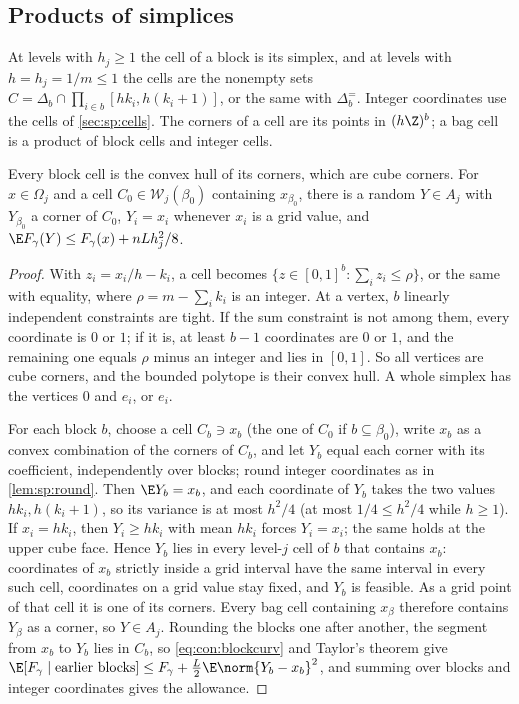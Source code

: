 \subsection{Products of simplices}\label{app:con:simplex}

At levels with $h_j\ge1$ the cell of a block is its simplex, and at levels
with $h=h_j=1/m\le1$ the cells are the nonempty sets
$C=\Delta_b\cap\prod_{i\in b}[hk_i,h(k_i+1)]$, or the same with
$\Delta^=_b$. Integer coordinates use the cells of \cref{sec:sp:cells}. The
corners of a cell are its points in $(h\Z)^b$; a bag cell is a product of
block cells and integer cells.

\begin{lemma}\label{lem:con:simplex-round}
Every block cell is the convex hull of its corners, which are cube corners.
For $x\in\Omega_j$ and a cell $C_0\in\mathcal W_j(\beta_0)$ containing
$x_{\beta_0}$, there is a random $Y\in A_j$ with $Y_{\beta_0}$ a corner of
$C_0$, $Y_i=x_i$ whenever $x_i$ is a grid value, and
$\E F_\gamma(Y)\le F_\gamma(x)+nLh_j^2/8$.
\end{lemma}

\begin{proof}
With $z_i=x_i/h-k_i$, a cell becomes $\{z\in[0,1]^b:\sum_iz_i\le\rho\}$, or
the same with equality, where $\rho=m-\sum_ik_i$ is an integer. At a vertex,
$b$ linearly independent constraints are tight. If the sum constraint is not
among them, every coordinate is $0$ or $1$; if it is, at least $b-1$
coordinates are $0$ or $1$, and the remaining one equals $\rho$ minus an
integer and lies in $[0,1]$. So all vertices are cube corners, and the
bounded polytope is their convex hull. A whole simplex has the vertices $0$
and $e_i$, or $e_i$.

For each block $b$, choose a cell $C_b\ni x_b$ (the one of $C_0$ if $b\subseteq
\beta_0$), write $x_b$ as a convex combination of the corners of $C_b$, and let
$Y_b$ equal each corner with its coefficient, independently over blocks;
round integer coordinates as in \cref{lem:sp:round}. Then $\E Y_b=x_b$, and
each coordinate of $Y_b$ takes the two values $hk_i,h(k_i+1)$, so its variance
is at most $h^2/4$ (at most $1/4\le h^2/4$ while $h\ge1$). If $x_i=hk_i$, then
$Y_i\ge hk_i$ with mean $hk_i$ forces $Y_i=x_i$; the same holds at the upper
cube face. Hence $Y_b$ lies in every level-$j$ cell of $b$ that contains $x_b$:
coordinates of $x_b$ strictly inside a grid interval have the same interval in
every such cell, coordinates on a grid value stay fixed, and $Y_b$ is
feasible. As a grid point of that cell it is one of its corners. Every bag
cell containing $x_\beta$ therefore contains $Y_\beta$ as a corner, so
$Y\in A_j$. Rounding the blocks one after another, the segment from $x_b$ to
$Y_b$ lies in $C_b$, so \eqref{eq:con:blockcurv} and Taylor's theorem give
$\E[F_\gamma\mid\text{earlier blocks}]\le F_\gamma+\frac L2\E\norm{Y_b-x_b}^2$,
and summing over blocks and integer coordinates gives the allowance.
\end{proof}


